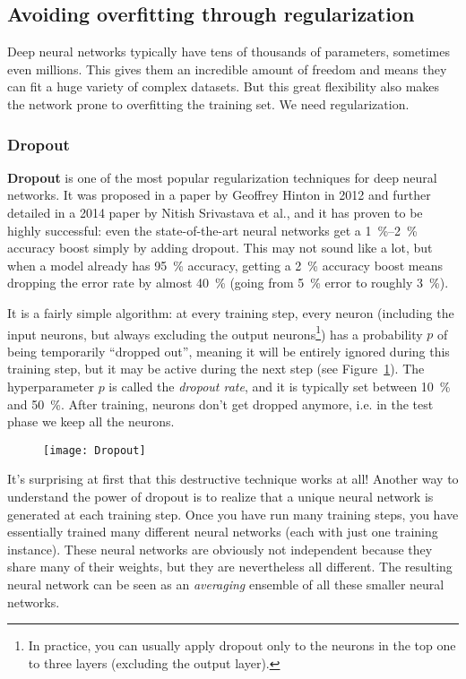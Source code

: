 \subsection{Avoiding overfitting through regularization}
Deep neural networks typically have tens of thousands of parameters, sometimes even millions. This gives them an incredible amount of freedom and means they can fit a huge variety of complex datasets. But this great flexibility also makes the network prone to overfitting the training set. We need regularization.
\subsubsection{Dropout}
\textbf{Dropout} is one of the most popular regularization techniques for deep neural networks. It was proposed in a paper by Geoffrey Hinton in 2012 and further detailed in a 2014 paper by Nitish Srivastava et al., and it has proven to be highly successful: even the state-of-the-art neural networks get a \SIrange{1}{2}{\percent} accuracy boost simply by adding dropout. This may not sound like a lot, but when a model already has \SI{95}{\percent} accuracy, getting a \SI{2}{\percent} accuracy boost means dropping the error rate by almost \SI{40}{\percent} (going from \SI{5}{\percent} error to roughly \SI{3}{\percent}).

It is a fairly simple algorithm: at every training step, every neuron (including the input neurons, but always excluding the output neurons\footnote{In practice, you can usually apply dropout only to the neurons in the top one to three layers (excluding the output layer).}) has a probability $p$ of being temporarily ``dropped out'', meaning it will be entirely ignored during this training step, but it may be active during the next step (see Figure~\ref{Dropout}). The hyperparameter $p$ is called the \emph{dropout rate}, and it is typically set between \SI{10}{\percent} and \SI{50}{\percent}. After training, neurons don't get dropped anymore, i.e. in the test phase we keep all the neurons.
\begin{figure}[h!t]
\centering
\texttt{[image: Dropout]}
\caption{}\label{Dropout}
\end{figure}

It's surprising at first that this destructive technique works at all! Another way to understand the power of dropout is to realize that a unique neural network is generated at each training step. Once you have run many training steps, you have essentially trained many different neural networks (each with just one training instance). These neural networks are obviously not independent because they share many of their weights, but they are nevertheless all different. The resulting neural network can be seen as an \emph{averaging} ensemble of all these smaller neural networks.


